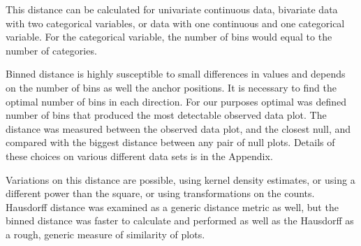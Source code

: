 \documentclass[12]{article}
\newcommand{\green}[1]{{\color{cyan} #1}}
\begin{document}
\begin{itemize}
%
%
%
%
%

This distance can be calculated for univariate continuous data, bivariate data with two categorical variables, or data with one continuous and one categorical variable. For the categorical variable, the number of bins would equal to the number of categories.

Binned distance is highly susceptible to small differences in values and depends on the number of bins as well the anchor positions. It is necessary to find the optimal number of bins in each direction. For our purposes optimal was defined number of bins that produced the most detectable observed data plot. The distance was measured between the observed data plot, and the closest null, and compared with the biggest distance between any pair of null plots. Details of these choices on various different data sets is in the Appendix.

Variations on this distance are possible, using kernel density estimates, or using a different power than the square, or using transformations on the counts. Hausdorff distance \citep{huttenlocher:1993} was examined as a generic distance metric as well, but the binned distance was faster to calculate and performed as well as the Hausdorff as a rough, generic measure of similarity of plots.


\end{itemize}
\end{document}
